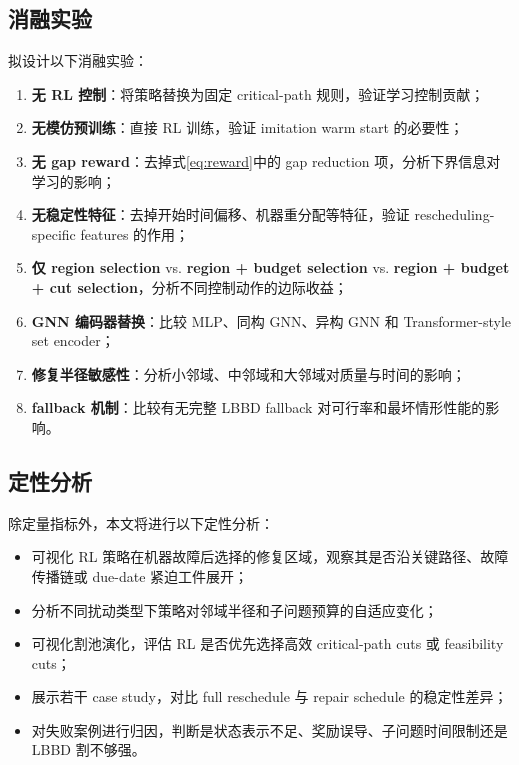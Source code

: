 \documentclass[UTF8,12pt,a4paper]{ctexart}
\begin{document}
\subsection{消融实验}

拟设计以下消融实验：
\begin{enumerate}
    \item \textbf{无 RL 控制}：将策略替换为固定 critical-path 规则，验证学习控制贡献；
    \item \textbf{无模仿预训练}：直接 RL 训练，验证 imitation warm start 的必要性；
    \item \textbf{无 gap reward}：去掉式\eqref{eq:reward}中的 gap reduction 项，分析下界信息对学习的影响；
    \item \textbf{无稳定性特征}：去掉开始时间偏移、机器重分配等特征，验证 rescheduling-specific features 的作用；
    \item \textbf{仅 region selection} vs. \textbf{region + budget selection} vs. \textbf{region + budget + cut selection}，分析不同控制动作的边际收益；
    \item \textbf{GNN 编码器替换}：比较 MLP、同构 GNN、异构 GNN 和 Transformer-style set encoder；
    \item \textbf{修复半径敏感性}：分析小邻域、中邻域和大邻域对质量与时间的影响；
    \item \textbf{fallback 机制}：比较有无完整 LBBD fallback 对可行率和最坏情形性能的影响。
\end{enumerate}

\subsection{定性分析}

除定量指标外，本文将进行以下定性分析：
\begin{itemize}
    \item 可视化 RL 策略在机器故障后选择的修复区域，观察其是否沿关键路径、故障传播链或 due-date 紧迫工件展开；
    \item 分析不同扰动类型下策略对邻域半径和子问题预算的自适应变化；
    \item 可视化割池演化，评估 RL 是否优先选择高效 critical-path cuts 或 feasibility cuts；
    \item 展示若干 case study，对比 full reschedule 与 repair schedule 的稳定性差异；
    \item 对失败案例进行归因，判断是状态表示不足、奖励误导、子问题时间限制还是 LBBD 割不够强。
\end{itemize}
\end{document}
